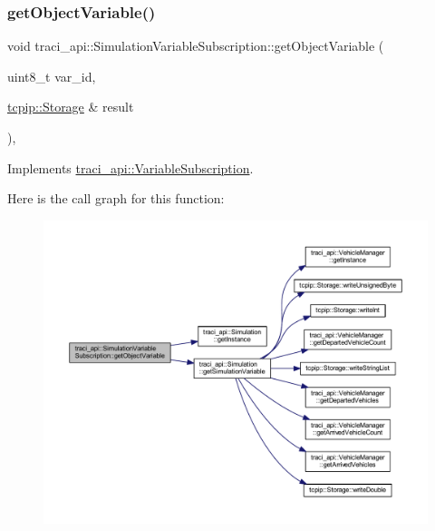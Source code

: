 \subsubsection{\texorpdfstring{get\+Object\+Variable()}{getObjectVariable()}}
{\footnotesize\ttfamily void traci\+\_\+api\+::\+Simulation\+Variable\+Subscription\+::get\+Object\+Variable (\begin{DoxyParamCaption}\item[{uint8\+\_\+t}]{var\+\_\+id,  }\item[{\hyperlink{classtcpip_1_1_storage}{tcpip\+::\+Storage} \&}]{result }\end{DoxyParamCaption})\hspace{0.3cm}{\ttfamily [override]}, {\ttfamily [virtual]}}



Implements \hyperlink{classtraci__api_1_1_variable_subscription_a884dba03a44455e86c417c3641ec6aa4}{traci\+\_\+api\+::\+Variable\+Subscription}.

Here is the call graph for this function\+:\nopagebreak
\begin{figure}[H]
\begin{center}
\leavevmode
\includegraphics[width=350pt]{classtraci__api_1_1_simulation_variable_subscription_aaa64f6368289ff45730d718e3f38f762_cgraph}
\end{center}
\end{figure}
\mbox{\label{classtraci__api_1_1_simulation_variable_subscription_a1f5a6a5d62fe7a054f87311b0c5b6f5f}} 
